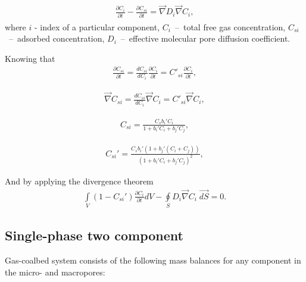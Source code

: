 \documentclass[a4paper,14pt,english]{extreport}
\begin{document}
\begin{eqnarray}
\begin{gathered}
\label{eq:diffusuin_multicomp_diff}
\frac{\partial C_{i}}{\partial t} - \frac{\partial C_{si}}{\partial t} =  \vec{\nabla} D_{i} \vec{\nabla}C_{i},
\end{gathered}
\end{eqnarray}
where $i$ - index of  a particular component, $C_{i}$~--~total free gas concentration, $C_{si}$~--~adsorbed concentration, $D_{i}$~--~effective molecular pore diffusion coefficient.

Knowing that
\begin{eqnarray}
\label{eq:variable_replace}
\frac{\partial C_{si}}{\partial t} =  \frac{dC_{si}}{dC_{i}}\frac{\partial C_{i}}{\partial t} = C'_{si}\frac{\partial C_{i}}{\partial t},
\end{eqnarray}

\begin{eqnarray}
\label{eq:variable_replace}
\vec\nabla C_{si} =  \frac{dC_{si}}{dC_{i}}\vec\nabla C_{i} = C'_{si}\vec\nabla C_{i},
\end{eqnarray}

\begin{eqnarray}
\label{eq:conc_sorption}
C_{si} =  \frac{C_{s} b_{i}' C_{i}}{1+b_{i}'C_{i}+b_{j}'C_{j}},
\end{eqnarray}

\begin{eqnarray}
\label{eq:conc_sorption_deriv}
C_{si}' =  \frac{C_{s}b_{i}' \left(1+b_{j}'\left(C_{i}+C_{j}\right)\right)}{\left(1+b_{i}'C_{i}+b_{j}'C_{j}\right)^2},
\end{eqnarray}

And by applying the divergence theorem 
\begin{eqnarray}
\label{eq:diffusuin_multicomp_integral}
\int \limits_{V} (1-C_{si}') \frac{\partial C_{i}}{\partial t} dV - \oint \limits_{S} D_{i} \vec{\nabla}C_{i} \; \vec{dS} = 0.
\end{eqnarray}

 \subsection*{Single-phase two component}
 Gas-coalbed system consists of the following mass balances for any component in the micro- and macropores:
 
\end{document}
